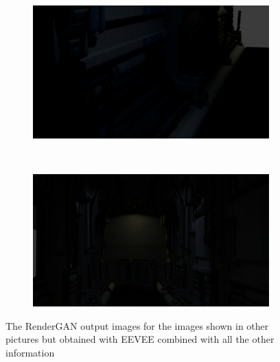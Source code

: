 \begin{figure}[h!]
    \centering
    \begin{subfigure}[b]{0.9\textwidth}
     \includegraphics[width=\textwidth]{figures/result/all/s9_camera_9_cycles_RN.png}
     \caption{}\label{subfig:1}
    \end{subfigure}
    \\ \vspace{0.2cm}
    \begin{subfigure}[b]{0.9\textwidth}
     \includegraphics[width=\textwidth]{figures/result/all/s9_camera_80_cycles_RN.png}
     \caption{}
    \end{subfigure}    
    \caption[RenderGAN output]{The RenderGAN output images for the images shown in other pictures but obtained with EEVEE combined with all the other information}
    \label{fig:RenderGAN_images1}
\end{figure}
